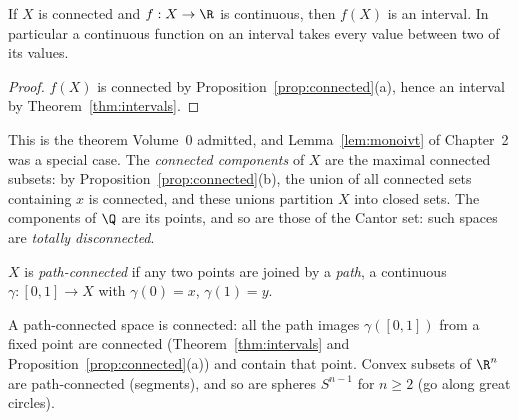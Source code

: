 \begin{corollary}\label{cor:ivt}
If $X$ is connected and $f:X\to\R$ is continuous, then $f(X)$ is an interval. In particular a continuous function on an interval takes
every value between two of its values.
\end{corollary}
\begin{proof}
$f(X)$ is connected by Proposition~\ref{prop:connected}(a), hence an interval by Theorem~\ref{thm:intervals}.
\end{proof}

This is the theorem Volume~0 admitted, and Lemma~\ref{lem:monoivt} of Chapter~2 was a special case. The \emph{connected components} of $X$ are the
maximal connected subsets: by Proposition~\ref{prop:connected}(b), the union of all connected sets containing $x$ is connected, and these
unions partition $X$ into closed sets. The components of $\Q$ are its points, and so are those of the Cantor set: such spaces are
\emph{totally disconnected}.

\begin{definition}
$X$ is \emph{path-connected} if any two points are joined by a \emph{path}, a continuous $\gamma:[0,1]\to X$ with $\gamma(0)=x$, $\gamma(1)=y$.
\end{definition}

A path-connected space is connected: all the path images $\gamma([0,1])$ from a fixed point are connected (Theorem~\ref{thm:intervals} and
Proposition~\ref{prop:connected}(a)) and contain that point. Convex subsets of $\R^n$ are path-connected (segments), and so are spheres
$S^{n-1}$ for $n\ge2$ (go along great circles).

